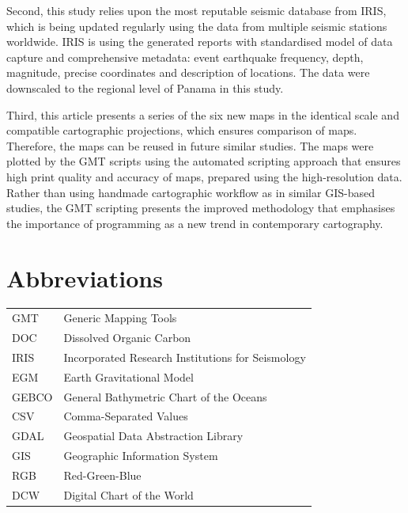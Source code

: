 \documentclass[USenglish,twocolumn]{article}
\begin{document}
Second, this study relies upon the most reputable seismic database from IRIS, which is being updated regularly using the data from multiple seismic stations worldwide. IRIS is using the generated reports with standardised model of data capture and comprehensive metadata: event earthquake frequency, depth, magnitude, precise coordinates and description of locations. The data were downscaled to the regional level of Panama in this study. 

Third, this article presents a series of the six new maps in the identical scale and compatible cartographic projections, which ensures comparison of maps. Therefore, the maps can be reused in future similar studies. The maps were plotted by the GMT scripts using the automated scripting approach that ensures high print quality and accuracy of maps, prepared using the high-resolution data. Rather than using handmade cartographic workflow as in similar GIS-based studies, the GMT scripting presents the improved methodology that emphasises the importance of programming as a new trend in contemporary cartography.

\section{Abbreviations}
\begin{tabular}{ | l | l | }
GMT & Generic Mapping Tools \\
DOC & Dissolved Organic Carbon \\
IRIS & Incorporated Research Institutions for Seismology \\
EGM & Earth Gravitational Model \\
GEBCO & General Bathymetric Chart of the Oceans \\ 
CSV & Comma-Separated Values \\
GDAL & Geospatial Data Abstraction Library \\
GIS & Geographic Information System \\
RGB & Red-Green-Blue \\
DCW & Digital Chart of the World \\
\hline
\end{tabular}


%

\end{document}
